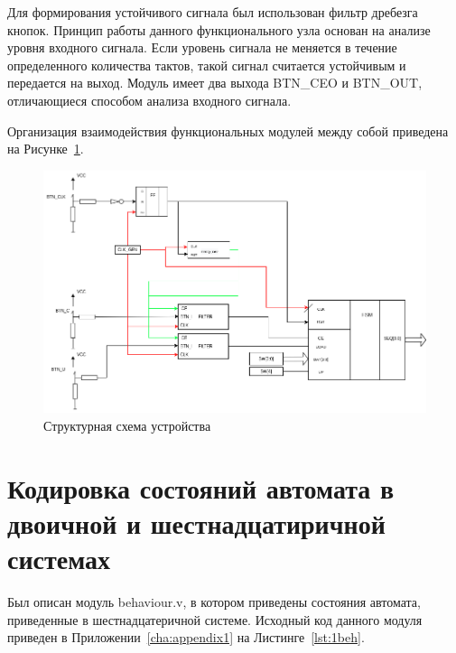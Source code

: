 Для формирования устойчивого сигнала был использован фильтр дребезга кнопок. Принцип работы данного функционального узла основан на анализе уровня входного сигнала. Если уровень сигнала не меняется в течение определенного количества тактов, такой сигнал считается устойчивым и передается на выход. Модуль имеет два выхода BTN\_CEO и BTN\_OUT, отличающиеся способом анализа входного сигнала.



Организация взаимодействия функциональных модулей между собой приведена на Рисунке~\ref{fig:fsm-struct}.
\begin{figure}[htpb]
	\centering
	\includegraphics[width=\linewidth]{course-plis/images/lab2/fsm-struct}
	\caption{Структурная схема  устройства}
	\label{fig:fsm-struct}
\end{figure}


\section{Кодировка состояний автомата в двоичной и шестнадцатиричной системах}
Был описан модуль behaviour.v, в котором приведены состояния автомата, приведенные в шестнадцатеричной системе.
Исходный код данного модуля приведен в Приложении~\ref{cha:appendix1} на Листинге~\ref{lst:1beh}.


